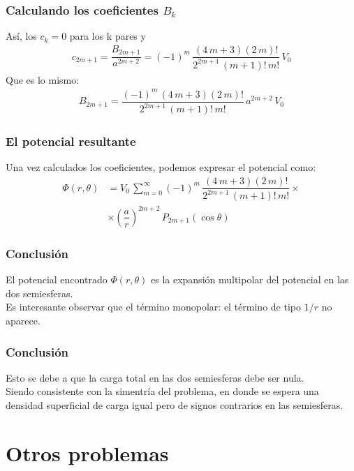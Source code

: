 \begin{frame}
\frametitle{Calculando los coeficientes $B_{k}$}
Así, los $c_{k} = 0$ para los k pares y
\begin{align*}
c_{2m+1} = \dfrac{B_{2m+1}}{a^{2m+2}} = (-1)^{m} \, \dfrac{(4 \, m + 3) ( 2 \, m)!}{2^{2m+1} \, (m + 1)! \, m!} \, V_{0}
\end{align*}
\pause
Que es lo mismo:
\begin{align*}
B_{2m+1} = \dfrac{(-1)^{m} \, (4 \, m + 3) ( 2 \, m)!}{2^{2m+1} \, (m + 1)! \, m!} \, a^{2m+2} \, V_{0}
\end{align*}
\end{frame}
\begin{frame}
\frametitle{El potencial resultante}
Una vez calculados los coeficientes, podemos expresar el potencial como:
\begin{align*}
\Phi(r, \theta) &= V_{0} \, \sum_{m=0}^{\infty} (-1)^{m} \, \dfrac{(4 \, m + 3) ( 2 \, m)!}{2^{2m+1} \, (m + 1)! \, m!} \times \\[0.5em]
&\times \left( \dfrac{a}{r} \right)^{2m+2} \, P_{2m+1} (\cos \theta)
\end{align*}
\end{frame}
\begin{frame}
\frametitle{Conclusión}
El potencial encontrado $\Phi(r, \theta)$ es la expansión multipolar del potencial en las dos semiesferas.
\\
\bigskip
\pause
Es interesante observar que el término monopolar: el término de tipo $1/r$ no aparece.
\end{frame}
\begin{frame}
\frametitle{Conclusión}
Esto se debe a que la carga total en las dos semiesferas debe ser nula.
\\
\bigskip
\pause
Siendo consistente con la simentría del problema, en donde se espera una densidad superficial de carga igual pero de signos contrarios en las semiesferas.
\end{frame}
\section{Otros problemas}
